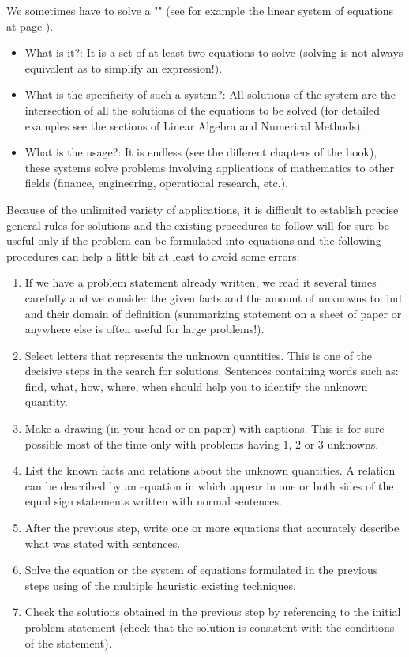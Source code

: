 	We sometimes have to solve a "" (see for example the linear system of equations at page \pageref{linear systems of equations}).
	\begin{itemize}
		\item What is it?: It is a set of at least two equations to solve (solving is not always equivalent as to simplify an expression!).

		\item What is the specificity of such a system?: All solutions of the system are the intersection of all the solutions of the equations to be solved (for detailed examples see the sections of Linear Algebra and Numerical Methods). 

		\item What is the usage?: It is endless (see the different chapters of the book), these systems solve problems involving applications of mathematics to other fields (finance, engineering, operational research, etc.).
	\end{itemize}		
	Because of the unlimited variety of applications, it is difficult to establish precise general rules for solutions and the existing procedures to follow will for sure be useful only if the problem can be formulated into equations and the following procedures can help a little bit at least to avoid some errors:
	\begin{enumerate}
		\item If we have a problem statement already written, we read it several times carefully and we consider the given facts and the amount of unknowns to find and their domain of definition (summarizing statement on a sheet of paper or anywhere else is often useful for large problems!).
		
		\item Select letters that represents the unknown quantities. This is one of the decisive steps in the search for solutions. Sentences containing words such as: find, what, how, where, when should help you to identify the unknown quantity.
		
		\item Make a drawing (in your head or on paper) with captions. This is for sure possible most of the time only with problems having $1$, $2$ or $3$ unknowns.
		
		\item List the known facts and relations about the unknown quantities. A relation can be described by an equation in which appear in one or both sides of the equal sign statements written with normal sentences.
		
		\item After the previous step, write one or more equations that accurately describe what was stated with sentences.
		
		\item Solve the equation or the system of equations formulated in the previous steps using of the multiple heuristic existing techniques.
		
		\item Check the solutions obtained in the previous step by referencing to the initial problem statement (check that the solution is consistent with the conditions of the statement).
	\end{enumerate}
